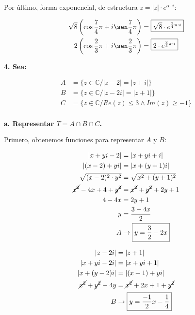 \documentclass[12pt]{article}
\begin{document}
Por último, forma exponencial, de estructura \(z = |z| \cdot e^{\alpha \cdot i}\):

\begin{align*}
    \sqrt{8}\left(\cos \frac{7}{4}\pi + i \sen \frac{7}{4}\pi\right) & = \boxed{\sqrt{8} \cdot e^{\frac{7}{4}\pi \cdot i}} \\
    2\left(\cos \frac{2}{3}\pi + i \sen \frac{2}{3}\pi\right)        & = \boxed{2 \cdot e^{\frac{2}{3}\pi \cdot i}}        \\
\end{align*}

\textbf{4. Sea: }

\begin{align*}
    A & = \{ z \in \mathbb{C} / |z - 2| = |z + i| \}                            \\
    B & = \{ z \in \mathbb{C} / |z - 2i| = |z + 1| \}                           \\
    C & = \{ z \in \mathbb{C} / Re(z) \leq 3 \wedge Im(z) \geq -1 \} \\
\end{align*}

\textbf{a. Representar \(T = A \cap B \cap C\).}

Primero, obtenemos funciones para representar \(A\) y \(B\):

\begin{align*}
    |x + yi - 2|                             & = |x + yi + i|                             \\
    |(x-2) + yi|                             & = |x + (y + 1)i|                           \\
    \sqrt{(x-2)^{2} \cdot y^{2}}             & = \sqrt{x^{2} + (y + 1)^{2}}               \\
    \cancel{x^{2}} - 4x + 4 + \cancel{y^{2}} & = \cancel{x^{2}} + \cancel{y^{2}} + 2y + 1 \\
    4 - 4x                                   & = 2y +1                                    \\
    y                                        & = \frac{3 - 4x}{2}                         \\
    A                                        & \rightarrow \boxed{y = \frac{3}{2} - 2x}
\end{align*}

\begin{align*}
    |z - 2i|                             & = |z + 1|                                           \\
    |x + yi - 2i|                        & = |x + yi + 1|                                      \\
    |x + (y-2)i|                         & = |(x+1) + yi|                                      \\
    \cancel{x^{2}} + \cancel{y^{2}} - 4y & = \cancel{x^{2}} + 2x + 1 + \cancel{y^{2}}          \\
    B                                    & \rightarrow \boxed{y = \frac{-1}{2}x - \frac{1}{4}} \\
\end{align*}
\end{document}
